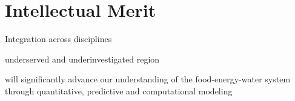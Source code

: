 \section{Intellectual Merit}
Integration across disciplines


underserved and underinvestigated region


will significantly advance our understanding of the food-energy-water system through quantitative, predictive and computational modeling


